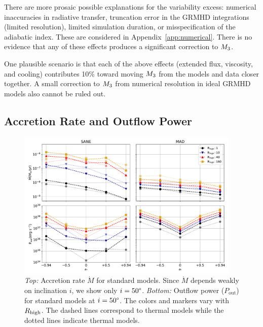 There are more prosaic possible explanations for the variability excess: numerical inaccuracies in radiative transfer, truncation error in the GRMHD integrations (limited resolution), limited simulation duration, or misspecification of the adiabatic index.  These are considered in Appendix~\ref{app:numerical}.  There is no evidence that any of these effects produces a significant correction to $M_{3}$.

One plausible scenario is that each of the above effects (extended flux, viscosity, and cooling) contributes 10\% toward moving $M_{3}$ from the models and data closer together. A small correction to $M_{3}$ from numerical resolution in ideal GRMHD models also cannot be ruled out.



\subsection{Accretion Rate and Outflow Power}



\begin{figure}
  \centering
  \includegraphics[width=0.95\textwidth]{figures/bhac_kharma_average_mdot_pout.pdf}
  \caption{{\it Top:} Accretion rate $\dot{M}$ for standard models. Since $\dot{M}$ depends weakly on inclination $i$, we show only $i=50\degree$. {\it Bottom:} Outflow power ($P_\mathrm{out}$) for standard models at $i = 50\degree$. The colors and markers vary with $R_\mathrm{high}$. The dashed lines correspond to \kharma thermal models while the dotted lines indicate \bhac thermal models.}
  \label{fig:accretion_outflow_power_illinois_thermal}
\end{figure}

